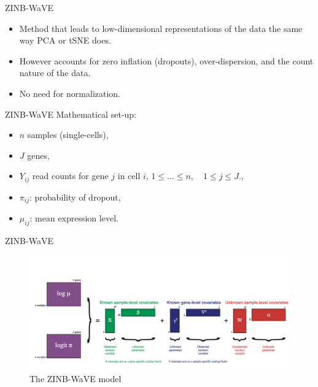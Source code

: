 \documentclass{beamer}
\begin{document}
\begin{frame}{ZINB-WaVE}

\begin{itemize}
  \itemsep10pt
  \item Method that leads to low-dimensional representations of the data the
    same way PCA or tSNE does. \pause
  \item However accounts for zero inflation (dropouts), over-dispersion, and the
    count nature of the data.
  \item No need for normalization.
\end{itemize}

\end{frame}




\begin{frame}{ZINB-WaVE}
Mathematical set-up:
\begin{itemize}
  \itemsep10pt
  \item $n$ samples (single-cells),
  \item $J$ genes,
  \item $Y_{ij}$ read counts for gene $j$ in cell $i$, $1\leq \ldots \leq n,
    \quad 1\leq j \leq J.$,
  \item $\pi_{ij}$: probability of dropout,
  \item $\mu_{ij}$: mean expression level.
\end{itemize}

\end{frame}


\begin{frame}{ZINB-WaVE}
\begin{figure}
  \centering
      \includegraphics[height=0.5\textheight]{zinbwave}
      \caption{The ZINB-WaVE model}
\end{figure}
\end{frame}
\end{document}
